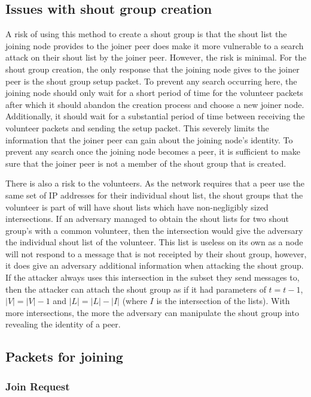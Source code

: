 \documentclass[ %
                    author={Luke Murray},
                supervisor={Dr. Simon Hollis},
                     title={Shadow Peer-to-Peer Networks},
                  subtitle={},
                    degree={MEng},
                      year={2013} ]{thesis}
\begin{document}
\subsection{Issues with shout group creation}

A risk of using this method to create a shout group is that the shout list the joining node provides to the joiner peer does make it more vulnerable to a search attack on their shout list by the joiner peer. However, the risk is minimal. For the shout group creation, the only response that the joining node gives to the joiner peer is the shout group setup packet. To prevent any search occurring here, the joining node should only wait for a short period of time for the volunteer packets after which it should abandon the creation process and choose a new joiner node. Additionally, it should wait for a substantial period of time between receiving the volunteer packets and sending the setup packet. This severely limits the information that the joiner peer can gain about the joining node's identity. To prevent any search once the joining node becomes a peer, it is sufficient to make sure that the joiner peer is not a member of the shout group that is created.

There is also a risk to the volunteers. As the network requires that a peer use the same set of IP addresses for their individual shout list, the shout groups that the volunteer is part of will have shout lists which have non-negligibly sized intersections. If an adversary managed to obtain the shout lists for two shout group's with a common volunteer, then the intersection would give the adversary the individual shout list of the volunteer. This list is useless on its own as a node will not respond to a message that is not receipted by their shout group, however, it does give an adversary additional information when attacking the shout group. If the attacker always uses this intersection in the subset they send messages to, then the attacker can attach the shout group as if it had parameters of $t = t - 1$, $|V| = |V| - 1$ and $|L| = |L| - |I|$ (where $I$ is the intersection of the lists). With more intersections, the more the adversary can manipulate the shout group into revealing the identity of a peer.

\subsection{Packets for joining}

\subsubsection{Join Request}
\end{document}
